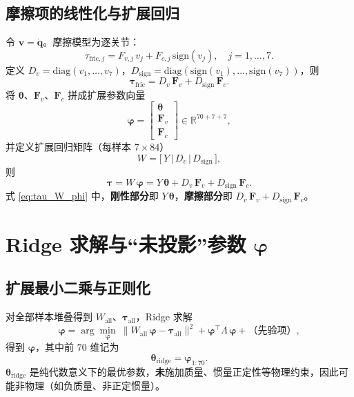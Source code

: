 \documentclass[12pt,a4paper]{article}
\begin{document}
\subsection{摩擦项的线性化与扩展回归}

令 $\bm{v}=\dot{\bm{q}}$。摩擦模型为逐关节：
\[
\tau_{\mathrm{fric},j} = F_{v,j}\,v_j + F_{c,j}\,\mathrm{sign}(v_j),\quad j=1,\ldots,7.
\]
定义 $D_v = \mathrm{diag}(v_1,\ldots,v_7)$，$D_{\mathrm{sign}} = \mathrm{diag}(\mathrm{sign}(v_1),\ldots,\mathrm{sign}(v_7))$，则
\[
\bm{\tau}_{\mathrm{fric}} = D_v\,\bm{F}_v + D_{\mathrm{sign}}\,\bm{F}_c.
\]
将 $\bm{\theta}$、$\bm{F}_v$、$\bm{F}_c$ 拼成扩展参数向量
\begin{equation}
  \bm{\varphi} = \begin{bmatrix} \bm{\theta} \\ \bm{F}_v \\ \bm{F}_c \end{bmatrix} \in \mathbb{R}^{70+7+7},
  \label{eq:phi}
\end{equation}
并定义扩展回归矩阵（每样本 $7\times 84$）
\begin{equation}
  W = \bigl[\, Y \,\big|\, D_v \,\big|\, D_{\mathrm{sign}} \,\bigr],
  \label{eq:W}
\end{equation}
则
\begin{equation}
  \bm{\tau} = W\,\bm{\varphi} = Y\,\bm{\theta} + D_v\,\bm{F}_v + D_{\mathrm{sign}}\,\bm{F}_c.
  \label{eq:tau_W_phi}
\end{equation}
式 \eqref{eq:tau_W_phi} 中，\textbf{刚性部分}即 $Y\,\bm{\theta}$，\textbf{摩擦部分}即 $D_v\,\bm{F}_v + D_{\mathrm{sign}}\,\bm{F}_c$。

\section{Ridge 求解与``未投影''参数 \texorpdfstring{$\bm{\varphi}$}{φ}}

\subsection{扩展最小二乘与正则化}

对全部样本堆叠得到 $W_{\mathrm{all}}$、$\bm{\tau}_{\mathrm{all}}$，Ridge 求解
\begin{equation}
  \bm{\varphi} = \arg\min_{\bm{\varphi}} \ \bigl\| W_{\mathrm{all}}\,\bm{\varphi} - \bm{\tau}_{\mathrm{all}} \bigr\|^2 + \bm{\varphi}^\top \Lambda \,\bm{\varphi} + \text{（先验项）},
  \label{eq:ridge}
\end{equation}
得到 $\bm{\varphi}$，其中前 $70$ 维记为
\begin{equation}
  \bm{\theta}_{\mathrm{ridge}} = \bm{\varphi}_{1:70}.
  \label{eq:theta_ridge}
\end{equation}
$\bm{\theta}_{\mathrm{ridge}}$ 是纯代数意义下的最优参数，\textbf{未}施加质量、惯量正定性等物理约束，因此可能非物理（如负质量、非正定惯量）。
\end{document}
